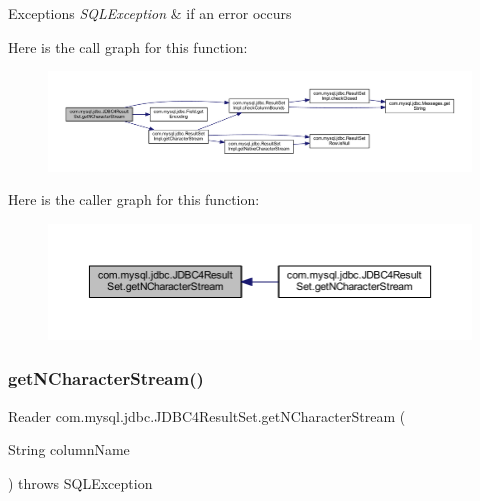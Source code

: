 \begin{DoxyExceptions}{Exceptions}
{\em S\+Q\+L\+Exception} & if an error occurs \\
\hline
\end{DoxyExceptions}
Here is the call graph for this function\+:
\nopagebreak
\begin{figure}[H]
\begin{center}
\leavevmode
\includegraphics[width=350pt]{classcom_1_1mysql_1_1jdbc_1_1_j_d_b_c4_result_set_a2581614c5be14cbcdd5e776e4bc7bc52_cgraph}
\end{center}
\end{figure}
Here is the caller graph for this function\+:
\nopagebreak
\begin{figure}[H]
\begin{center}
\leavevmode
\includegraphics[width=350pt]{classcom_1_1mysql_1_1jdbc_1_1_j_d_b_c4_result_set_a2581614c5be14cbcdd5e776e4bc7bc52_icgraph}
\end{center}
\end{figure}
\mbox{\label{classcom_1_1mysql_1_1jdbc_1_1_j_d_b_c4_result_set_a4477f8b894dc7e0892bb80064db7f499}} 
\subsubsection{\texorpdfstring{get\+N\+Character\+Stream()}{getNCharacterStream()}\hspace{0.1cm}{\footnotesize\ttfamily [2/2]}}
{\footnotesize\ttfamily Reader com.\+mysql.\+jdbc.\+J\+D\+B\+C4\+Result\+Set.\+get\+N\+Character\+Stream (\begin{DoxyParamCaption}\item[{String}]{column\+Name }\end{DoxyParamCaption}) throws S\+Q\+L\+Exception}

